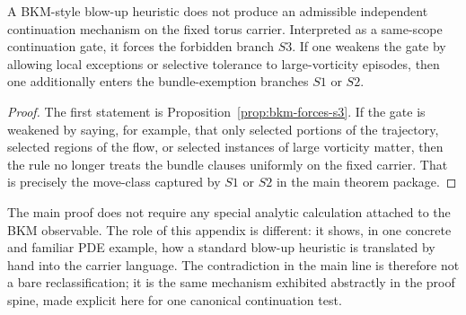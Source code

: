 \begin{corollary}\label{cor:concrete-bkm-translation}
A BKM-style blow-up heuristic does not produce an admissible independent continuation mechanism on the
fixed torus carrier. Interpreted as a same-scope continuation gate, it forces the forbidden branch $S3$.
If one weakens the gate by allowing local exceptions or selective tolerance to large-vorticity episodes,
then one additionally enters the bundle-exemption branches $S1$ or $S2$.
\end{corollary}

\begin{proof}
The first statement is Proposition~\ref{prop:bkm-forces-s3}. If the gate is weakened by saying, for
example, that only selected portions of the trajectory, selected regions of the flow, or selected
instances of large vorticity matter, then the rule no longer treats the bundle clauses uniformly on the
fixed carrier. That is precisely the move-class captured by $S1$ or $S2$ in the main theorem package.
\end{proof}

\begin{remark}
The main proof does not require any special analytic calculation attached to the BKM observable. The
role of this appendix is different: it shows, in one concrete and familiar PDE example, how a standard
blow-up heuristic is translated by hand into the carrier language. The contradiction in the main line is
therefore not a bare reclassification; it is the same mechanism exhibited abstractly in the proof spine,
made explicit here for one canonical continuation test.
\end{remark}



\clearpage
